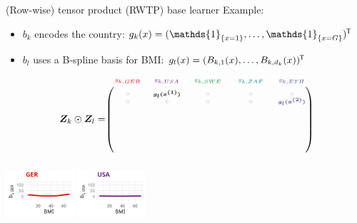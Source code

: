 \documentclass[t,10pt]{beamer}
\begin{document}
\begin{frame}{(Row-wise) tensor product (RWTP) base learner}
  Example:
  \begin{itemize}
    \item $b_k$ encodes the country: $g_k(x) = (\mathds{1}_{\{x = 1\}}, \dots, \mathds{1}_{\{x = G\}})^\tran$
    \item $b_l$ uses a B-spline basis for BMI: $g_l(x) = (B_{k,1}(x), \dots, B_{k,d_k}(x))^{\mkern-1.5mu\mathsf{T}}$
  \end{itemize}
  $$
    \design_k \odot \design_l = \tiny\begin{blockarray}{ccccc}
      \color[HTML]{EE0000}g_{k,GER} & \color[HTML]{631879}g_{k,USA} & \color[HTML]{008B45}g_{k,SWE} & \color[HTML]{008280}g_{k,ZAF} & \color[HTML]{3B4992}g_{k,ETH}\\
    \begin{block}{(ccccc)}
      \phantom{x}\\
      \color{lightgray}0 & \color{black}\bm{g_l(x^{(1)})} & \color{lightgray}0 & \color{lightgray}0 & \color{lightgray}0 \\
      \color{lightgray}0 & \color{lightgray}0 & \color{lightgray}0 & \color{lightgray}0 & \color[HTML]{3B4992}\bm{g_l(x^{(2)})} \\
      \color{white}\bm{g_l(x^{(3)})} & \color{white}0 & \color{white}0 & \color{white}0 & \color{white}0 \\
      \color{white}\vdots & \color{white}\vdots & \color{white}\vdots & \color{white}\vdots & \color{white}\vdots \\
      \color{white}0 & \color{white}0 & \color{white}\bm{g_l(x^{(73)})} & \color{white}0 & \color{white}0 \\
      \color{white}0 & \color{white}0 & \color{white}0 & \color{white}\bm{g_l(x^{(74)})} & \color{white}0 \\
      \color{white}0 & \color{white}0 & \color{white}\bm{g_l(x^{(75)})} & \color{white}0 & \color{white}0 \\
      \phantom{x}\\
    \end{block}
  \end{blockarray}
  $$
  \normalsize
  {\includegraphics[width=0.19\textwidth]{figures/bs-tensor/fig-tensor-GER.png}}
  {\includegraphics[width=0.19\textwidth]{figures/bs-tensor/fig-tensor-USA.png}}

\end{frame}
\end{document}
